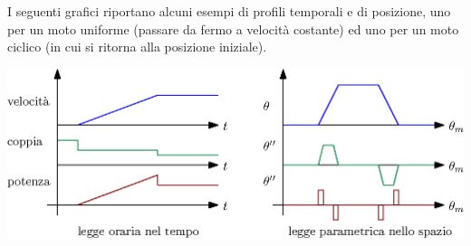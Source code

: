 \documentclass[10pt, letterpaper]{report}
\begin{document}
I seguenti grafici riportano alcuni esempi di profili temporali e di posizione, uno per un moto uniforme (passare da fermo a velocità costante) ed uno per un moto ciclico (in cui si ritorna alla posizione iniziale).
\begin{center}
    \includegraphics[width=\textwidth]{images/profiliMoti.eps }
\end{center}
\end{document}
